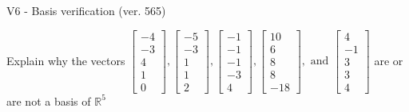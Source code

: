 \begin{exercise}
  \begin{exerciseTitle}V6 - Basis verification (ver. 565)\end{exerciseTitle}
  \begin{exerciseStatement}
    Explain why the vectors \(\left[\begin{array}{r}
-4 \\
-3 \\
4 \\
1 \\
0
\end{array}\right] , \left[\begin{array}{r}
-5 \\
-3 \\
1 \\
1 \\
2
\end{array}\right] , \left[\begin{array}{r}
-1 \\
-1 \\
-1 \\
-3 \\
4
\end{array}\right] , \left[\begin{array}{r}
10 \\
6 \\
8 \\
8 \\
-18
\end{array}\right] , \text{ and } \left[\begin{array}{r}
4 \\
-1 \\
3 \\
3 \\
4
\end{array}\right]\) are or are not a basis of \(\mathbb{R}^5\)	



\end{exerciseStatement}
\end{exercise}
